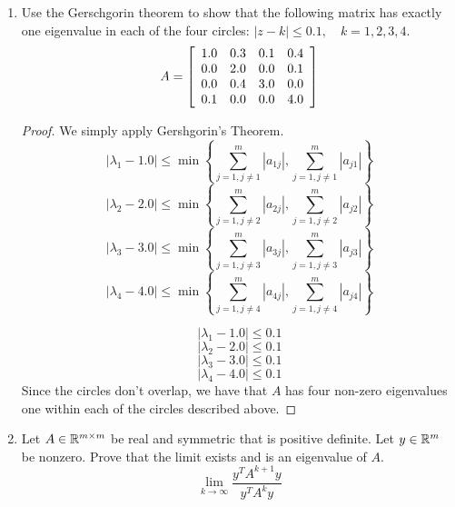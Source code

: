 \documentclass{article}
\begin{document}
\begin{enumerate}
\item  %
Use the Gerschgorin theorem to show that the following matrix has exactly one eigenvalue in each of the four circles: $|z - k| \le 0.1, \quad k = 1, 2, 3, 4$. 
\[
    A = \left[\begin{array}{c c c c} 1.0 & 0.3 & 0.1 & 0.4 \\
                                    0.0 & 2.0 & 0.0 & 0.1 \\
                                    0.0 & 0.4 & 3.0 & 0.0 \\
                                    0.1 & 0.0 & 0.0 & 4.0 \end{array}\right]
\]

\begin{proof}
    
    We simply apply Gershgorin's Theorem. 
    \[
        |\lambda_1 - 1.0| \le \min\left\{\sum_{j=1, j\neq 1}^m |a_{1j}|, \sum_{j=1, j\neq 1}^m |a_{j1}|\right\}
    \]
    \[
        |\lambda_2 - 2.0| \le \min\left\{\sum_{j=1, j\neq 2}^m |a_{2j}|, \sum_{j=1, j\neq 2}^m |a_{j2}|\right\}
    \]
    \[
        |\lambda_3 - 3.0| \le \min\left\{\sum_{j=1, j\neq 3}^m |a_{3j}|, \sum_{j=1, j\neq 3}^m |a_{j3}|\right\}
    \]
    \[
        |\lambda_4 - 4.0| \le \min\left\{\sum_{j=1, j\neq 4}^m |a_{4j}|, \sum_{j=1, j\neq 4}^m |a_{j4}|\right\}
    \]

    \[
        |\lambda_1 - 1.0| \le 0.1
    \]
    \[
        |\lambda_2 - 2.0| \le 0.1
    \]
    \[
        |\lambda_3 - 3.0| \le 0.1
    \]
    \[
        |\lambda_4 - 4.0| \le 0.1
    \]
    Since the circles don't overlap, we have that $A$ has four non-zero eigenvalues one within each of the circles described above. 


\end{proof}


\item %
Let $A \in \mathbb{R}^{m \times m}$ be real and symmetric that is positive definite. Let $y \in \mathbb{R}^m$ be nonzero. Prove that the limit exists and is an eigenvalue of $A$.
\[
    \lim_{k \to \infty} \frac{y^TA^{k+1}y}{y^TA^ky}
\]


\end{enumerate}
\end{document}
